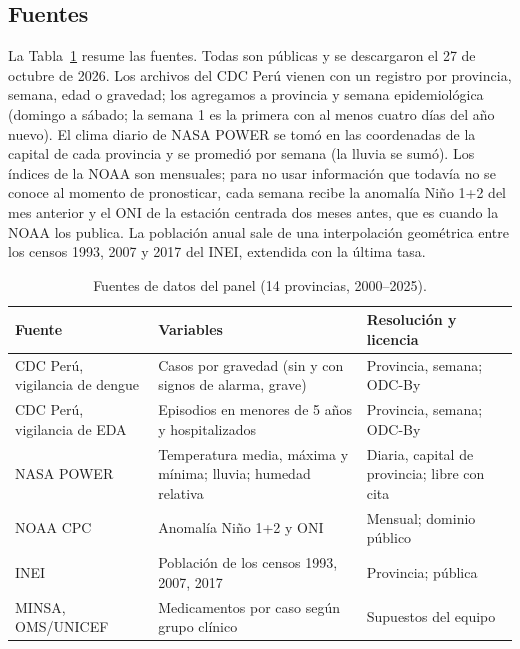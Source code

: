 \documentclass[conference,a4paper]{IEEEtran}
\begin{document}
\subsection{Fuentes}
La Tabla~\ref{tab:fuentes} resume las fuentes. Todas son públicas y se descargaron el 27 de octubre de 2026. Los archivos del CDC Perú vienen con un registro por provincia, semana, edad o gravedad; los agregamos a provincia y semana epidemiológica (domingo a sábado; la semana 1 es la primera con al menos cuatro días del año nuevo). El clima diario de NASA POWER \cite{nasapower} se tomó en las coordenadas de la capital de cada provincia y se promedió por semana (la lluvia se sumó). Los índices de la NOAA son mensuales; para no usar información que todavía no se conoce al momento de pronosticar, cada semana recibe la anomalía Niño 1+2 del mes anterior y el ONI de la estación centrada dos meses antes, que es cuando la NOAA los publica. La población anual sale de una interpolación geométrica entre los censos 1993, 2007 y 2017 del INEI, extendida con la última tasa.

\begin{table}[t]
\centering
\caption{Fuentes de datos del panel (14 provincias, 2000--2025).}\label{tab:fuentes}
\setlength{\tabcolsep}{2.5pt}\footnotesize
\begin{tabular}{>{\raggedright\arraybackslash}p{2.2cm}>{\raggedright\arraybackslash}p{3.3cm}>{\raggedright\arraybackslash}p{2.25cm}}
\toprule
Fuente & Variables & Resolución y licencia \\
\midrule
CDC Perú, vigilancia de dengue \cite{cdcperu2026dengue} & Casos por gravedad (sin y con signos de alarma, grave) & Provincia, semana; ODC-By \\
CDC Perú, vigilancia de EDA \cite{cdcperu2026eda} & Episodios en menores de 5 años y hospitalizados & Provincia, semana; ODC-By \\
NASA POWER \cite{nasapower} & Temperatura media, máxima y mínima; lluvia; humedad relativa & Diaria, capital de provincia; libre con cita \\
NOAA CPC \cite{noaa2026indices} & Anomalía Niño 1+2 y ONI & Mensual; dominio público \\
INEI & Población de los censos 1993, 2007, 2017 & Provincia; pública \\
MINSA, OMS/UNICEF \cite{who2009dengue,who2004zinc} & Medicamentos por caso según grupo clínico & Supuestos del equipo \\
\bottomrule
\end{tabular}
\end{table}
\end{document}
